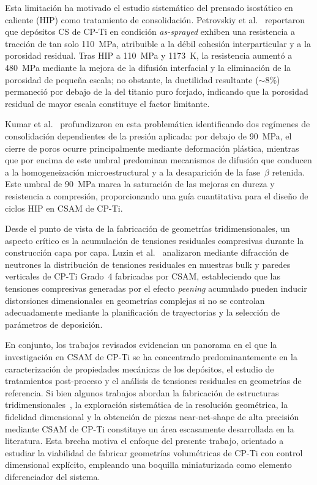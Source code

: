 Esta limitación ha motivado el estudio sistemático del prensado
isostático en caliente (HIP) como tratamiento de consolidación.
Petrovskiy et al.~\cite{Petrovskiy2019} reportaron que depósitos CS de
CP-Ti en condición \textit{as-sprayed} exhiben una resistencia a
tracción de tan solo \SI{110}{MPa}, atribuible a la débil cohesión
interparticular y a la porosidad residual. Tras HIP a \SI{110}{MPa} y
\SI{1173}{K}, la resistencia aumentó a \SI{480}{MPa} mediante la mejora
de la difusión interfacial y la eliminación de la porosidad de pequeña
escala; no obstante, la ductilidad resultante ($\sim$8\%) permaneció por
debajo de la del titanio puro forjado, indicando que la porosidad
residual de mayor escala constituye el factor limitante.

 Kumar
et al.~\cite{Kumar2025} profundizaron en esta problemática identificando
dos regímenes de consolidación dependientes de la presión aplicada: por
debajo de \SI{90}{MPa}, el cierre de poros ocurre principalmente mediante
deformación plástica, mientras que por encima de este umbral predominan
mecanismos de difusión que conducen a la homogeneización microestructural
y a la desaparición de la fase~$\beta$ retenida. Este umbral de
\SI{90}{MPa} marca la saturación de las mejoras en dureza y resistencia
a compresión, proporcionando una guía cuantitativa para el diseño de
ciclos HIP en CSAM de CP-Ti.

Desde el punto de vista de la fabricación de geometrías tridimensionales,
un aspecto crítico es la acumulación de tensiones residuales compresivas
durante la construcción capa por capa. Luzin et al.~\cite{Luzin2020wall}
analizaron mediante difracción de neutrones la distribución de tensiones
residuales en muestras bulk y paredes verticales de CP-Ti Grado~4
fabricadas por CSAM, estableciendo que las tensiones compresivas
generadas por el efecto \textit{peening} acumulado pueden inducir
distorsiones dimensionales en geometrías complejas si no se controlan
adecuadamente mediante la planificación de trayectorias y la selección
de parámetros de deposición.

En conjunto, los trabajos revisados evidencian un panorama en el que la
investigación en CSAM de CP-Ti se ha concentrado predominantemente en la
caracterización de propiedades mecánicas de los depósitos, el estudio de
tratamientos post-proceso y el análisis de tensiones residuales en
geometrías de referencia. Si bien algunos trabajos abordan la fabricación
de estructuras tridimensionales~\cite{MacDonald2017, Luzin2020wall,
VargasUscategui2021}, la exploración sistemática de la resolución
geométrica, la fidelidad dimensional y la obtención de piezas
near-net-shape de alta precisión mediante CSAM de CP-Ti constituye un
área escasamente desarrollada en la literatura. Esta brecha motiva el
enfoque del presente trabajo, orientado a estudiar la viabilidad de
fabricar geometrías volumétricas de CP-Ti con control dimensional
explícito, empleando una boquilla miniaturizada como elemento diferenciador
del sistema.